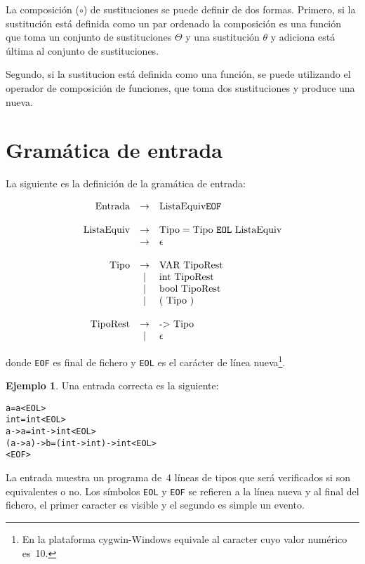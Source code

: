 \documentclass{article}
\theoremstyle{definition}
\newtheorem{example}{Ejemplo}[section]
\begin{document}
La composición ($\circ$) de sustituciones se puede definir de dos
formas. Primero, si la sustitución está definida como un par ordenado
la composición es una función que toma un conjunto de sustituciones
$\Theta$ y una sustitución $\theta$ y adiciona está última al conjunto
de sustituciones.

Segundo, si la sustitucion está definida como una
función, se puede utilizando el operador de composición de funciones,
que toma dos sustituciones y produce una nueva.

\section{Gramática de entrada}
\label{sec:gramatica-de-entrada}

La siguiente es la definición de la gramática de entrada:

\[
  \begin{array}[h]{rcl}
    \text{Entrada} & \to  & \text{ListaEquiv} \texttt{EOF}
    \\
    \\
    \text{ListaEquiv} & \to & \text{Tipo} = \text{Tipo}\ \texttt{EOL}\
                              \text{ListaEquiv}
    \\
                   & \to & \epsilon
    \\
    \\
    \text{Tipo}    & \to & \text{VAR}\  \text{TipoRest}
    \\
                   & \mid & \text{int}\ \text{TipoRest}
    \\
                   & \mid & \text{bool}\ \text{TipoRest}
    \\
                   & \mid & (\ \text{Tipo} \ )
    \\
    \\
    \text{TipoRest} & \to & \text{-$>$}\ \text{Tipo}
    \\
                   & \mid & \epsilon
  \end{array}
\]

donde \texttt{EOF} es final de fichero y \texttt{EOL} es el carácter
de línea nueva\footnote{En la plataforma cygwin-Windows equivale al
  caracter cuyo valor numérico es~10.}.

\begin{example}
Una entrada correcta es la siguiente:

\begin{alltt}
a = a <EOL>
int = int <EOL>
a -> a = int -> int <EOL>
(a -> a) -> b = (int -> int) -> int <EOL>
<EOF>
\end{alltt}

La entrada muestra un programa de~4 líneas de tipos que será
verificados si son equivalentes o no. Los símbolos \texttt{EOL} y
\texttt{EOF} se refieren a la línea nueva y al final del fichero, el
primer caracter es visible y el segundo es simple un evento.
\end{example}
\end{document}
